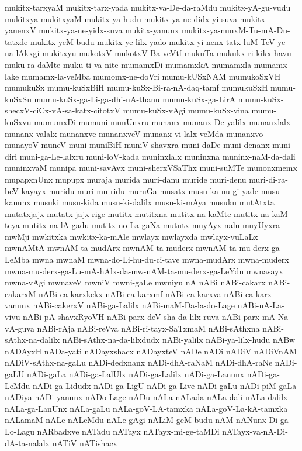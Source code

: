 {mukitx-tarxyaM
mukitx-tarx-yada
mukitx-va-De-da-raMdu
mukitx-yA-gu-vudu
mukitxya
mukitxyaM
mukitx-ya-hudu
mukitx-ya-ne-didx-yi-suva
mukitx-yanenxV
mukitx-ya-ne-yidx-suva
mukitx-yanunx
mukitx-ya-nunxM-Tu-mA-Du-tatxde
mukitx-yeM-budu
mukitx-ye-lilx-yado
mukitx-yi-nenx-tatx-luM-TeV-ye-na-lAkxgi
mukitxyu
mukotxV
mukotxV-Ba-veVtf
mukuTa
mukukx-ri-kikx-havu
muku-ra-daMte
muku-ti-va-nite
mumamxDi
mumamxkA
mumamxla
mumamx-lake
mumamx-la-veMba
mumomx-ne-doVri
mumu-kUSxNAM
mumukoSxVH
mumukuSx
mumu-kuSxBiH
mumu-kuSx-Bi-ra-nA-daq-tamf
mumukuSxH
mumu-kuSxSu
mumu-kuSx-ga-Li-ga-dhi-nA-thanu
mumu-kuSx-ga-LirA
mumu-kuSx-shecxV-ciCx-vA-sa-katx-citotxV
mumu-kuSx-vAgi
mumu-kuSx-vina
mumu-kuSxvu
mumumxDi
mumuni
munUnxru
munanx
munanx-De-yalilx
munanxlalx
munanx-valalx
munanxve
munanxveV
munanx-vi-lalx-veMda
munanxvo
munayoV
muneV
muni
muniBiH
muniV-shavxra
muni-daDe
muni-denanx
muni-diri
muni-ga-Le-lalxru
muni-loV-kada
muninxlalx
muninxna
muninx-naM-da-dali
muninxvaM
munipa
muni-savAvx
muni-sherxVSaThx
muni-suMTe
munonxmemx
mupapxnUnx
mupupx
muraja
murida
muri-danu
muride
muri-denu
muri-di-ra-beV-kayayx
muridu
muri-mu-ridu
muruGa
musatx
musu-ka-nu-gi-yade
musu-kanunx
musuki
musu-kida
musu-ki-dalilx
musu-ki-mAya
musuku
mutAtxta
mutatxjajx
mutatx-jajx-rige
mutitx
mutitxna
mutitx-na-kaMte
mutitx-na-kaM-teya
mutitx-na-lA-gadu
mutitx-no-La-gaNa
mututx
muyAyx-nalu
muyUyxra
mwMji
mwkitxka
mwkitx-ka-mAle
mwlayx
mwlayxda
mwlayx-vuLaLx
mwnAMtA
mwnAM-ta-mudArx
mwnAM-ta-muderx
mwnAM-ta-mu-derx-ga-LeMba
mwna
mwnaM
mwna-do-Li-hu-du-ci-tave
mwna-mudArx
mwna-muderx
mwna-mu-derx-ga-Lu-mA-hAlx-da-mw-nAM-ta-mu-derx-ga-LeYdu
mwnasayx
mwna-vAgi
mwnaveV
mwniV
mwni-gaLe
mwniyu
nA
nABi
nABi-cakarx
nABi-cakarxM
nABi-ca-karxkekx
nABi-ca-karxmf
nABi-ca-karxva
nABi-ca-karx-vanunx
nABi-cakerxV
nABi-ga-Lalilx
nABi-maM-Da-la-do-Lage
nABi-nA-La-vivu
nABi-pA-shavxRyoVH
nABi-parx-deV-sha-da-lilx-ruva
nABi-parx-mA-Na-vA-guva
nABi-rAja
nABi-reVva
nABi-ri-tayx-SaTxmaM
nABi-sAthxna
nABi-sAthx-na-dalilx
nABi-sAthx-na-da-lilxdudx
nABi-yalilx
nABi-ya-lilx-hudu
nABw
nADAyxH
nADa-yati
nADayxshacx
nADayxteV
nADe
nADi
nADiV
nADiVnAM
nADiV-sAthx-na-gaLu
nADi-dedxnanx
nADi-dhA-raNaM
nADi-dhA-raNe
nADi-gaLU
nADi-gaLa
nADi-ga-LalUlx
nADi-ga-Lalilx
nADi-ga-Lanunx
nADi-ga-LeMdu
nADi-ga-Lidudx
nADi-ga-LigU
nADi-ga-Live
nADi-gaLu
nADi-piM-gaLa
nADiya
nADi-yanunx
nADo-Lage
nADu
nALa
nALada
nALa-dali
nALa-dalilx
nALa-ga-LanUnx
nALa-gaLu
nALa-goV-LA-tamxka
nALa-goV-La-kA-tamxka
nALamaM
nALe
nALeMdu
nALe-gAgi
nALiM-geM-budu
nAM
nANunx-Di-ga-Lo-Lagu
nARbadxve
nATadu
nATayx
nATayx-mi-ge-taMDi
nATayx-va-nA-Di-dA-ta-nalalx
nATiV
nATishacx
}
